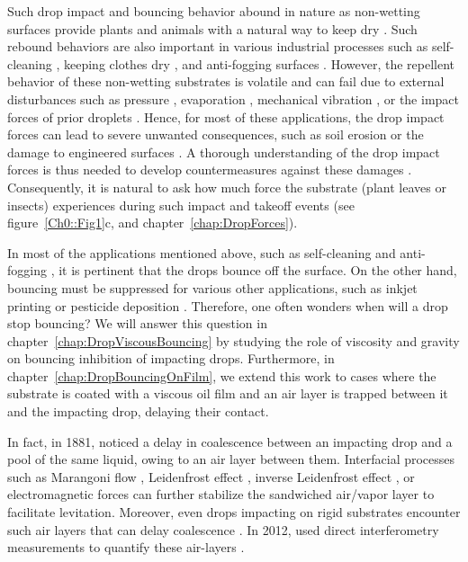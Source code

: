 Such drop impact and bouncing behavior abound in nature as non-wetting surfaces provide plants and animals with a natural way to keep dry \citep{neinhuis1997characterization, quere2008wetting, dickerson2012mosquitoes}. Such rebound behaviors are also important in various industrial processes \citep{yarin2017} such as self-cleaning \citep{blossey2003self}, keeping clothes dry \citep{liu2008hydrophobic}, and anti-fogging surfaces \citep{mouterde2017antifogging}. However, the repellent behavior of these non-wetting substrates is volatile and can fail due to external disturbances such as pressure \cite{lafuma2003, callies2005water, sbragaglia2007, li2017}, evaporation \cite{tsai2010, chen2012, papadopoulos2013},  mechanical vibration \cite{bormashenko2007}, or the impact forces of prior droplets \cite{bartolo2006bouncing}. Hence, for most of these applications, the drop impact forces can lead to severe unwanted consequences, such as soil erosion \cite{nearing1986} or the damage to engineered surfaces \cite{ahmad2013, amirzadeh2017, gohardani2011}. A thorough understanding of the drop impact forces is thus needed to develop countermeasures against these damages \cite{cheng2021drop}. Consequently, it is natural to ask how much force the substrate (plant leaves or insects) experiences during such impact and takeoff events (see figure~\ref{Ch0::Fig1}c, \citep{dickerson2012mosquitoes, UJThesis} and chapter~\ref{chap:DropForces}).

In most of the applications mentioned above, such as self-cleaning \citep{blossey2003self} and anti-fogging  \citep{mouterde2017antifogging}, it is pertinent that the drops bounce off the surface. On the other hand, bouncing must be suppressed for various other applications, such as inkjet printing \citep{lohse2022fundamental} or pesticide deposition \cite{gart2015droplet, he2021optimization, hoffman2021controlling}. Therefore, one often wonders when will a drop stop bouncing? We will answer this question in chapter~\ref{chap:DropViscousBouncing} by studying the role of viscosity and gravity on bouncing inhibition of impacting drops. Furthermore, in chapter~\ref{chap:DropBouncingOnFilm}, we extend this work to cases where the substrate is coated with a viscous oil film and an air layer is trapped between it and the impacting drop, delaying their contact. 

In fact, in 1881, \citet{reynolds1881floating} noticed a delay in coalescence between an impacting drop and a pool of the same liquid, owing to an air layer between them. Interfacial processes such as Marangoni flow \citep{geri2017thermal}, Leidenfrost effect \citep{Boerhaave1732, leidenfrost1756,  chandra1991collision, tran2012drop, quere2013leidenfrost, shirota2016dynamic, chantelot2021leidenfrost}, inverse Leidenfrost effect \citep{adda2016inverse, gauthier2019capillary, gauthier2019self}, or electromagnetic forces \citep{pal2017control, singh2018levitation} can further stabilize the sandwiched air/vapor layer to facilitate levitation. Moreover, even drops impacting on rigid substrates encounter such air layers that can delay coalescence \citep{kolinski2012skating}. In 2012, \citet{van2012direct} used direct interferometry measurements to quantify these air-layers \citep[also see][]{mandre2009precursors, driscoll2011ultrafast, bouwhuis2012}.
 
